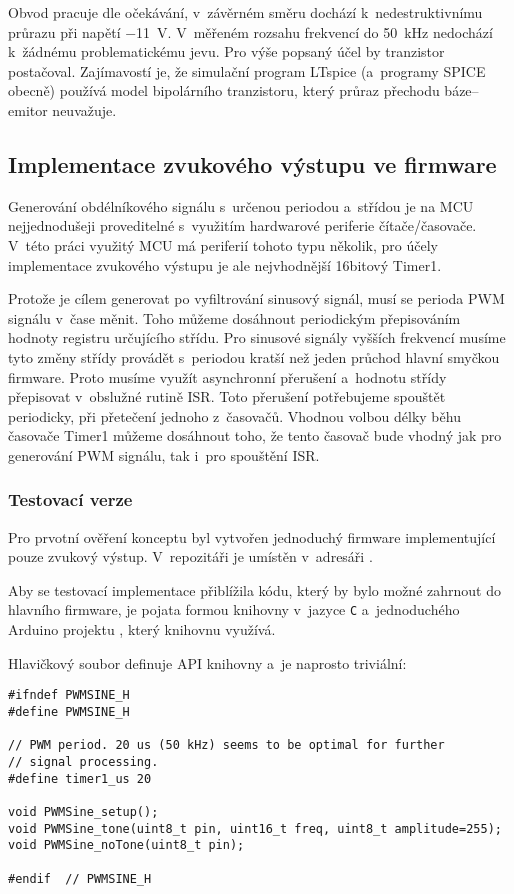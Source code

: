 Obvod pracuje dle očekávání, v~závěrném směru dochází k~nedestruktivnímu
průrazu při napětí \SI{-11}{\volt}. V~měřeném rozsahu frekvencí do
\SI{50}{\kilo\hertz} nedochází k~žádnému problematickému jevu. Pro výše popsaný
účel by tranzistor postačoval. Zajímavostí je, že simulační program LTspice
(a~programy SPICE obecně) používá model bipolárního tranzistoru, který průraz
přechodu báze--emitor neuvažuje.



\FloatBarrier  %
\subsection{Implementace zvukového výstupu ve firmware}
Generování obdélníkového signálu s~určenou periodou a~střídou je na MCU
nejjednodušeji proveditelné s~využitím hardwarové periferie čítače/časovače.
V~této práci využitý MCU má periferií tohoto typu několik, pro účely
implementace zvukového výstupu je ale nejvhodnější 16bitový Timer1.

Protože je cílem generovat po vyfiltrování sinusový signál, musí se perioda PWM
signálu v~čase měnit. Toho můžeme dosáhnout periodickým přepisováním hodnoty
registru určujícího střídu. Pro sinusové signály vyšších frekvencí musíme tyto
změny střídy provádět s~periodou kratší než jeden průchod hlavní smyčkou
firmware. Proto musíme využít asynchronní přerušení a~hodnotu střídy přepisovat
v~obslužné rutině ISR. Toto přerušení potřebujeme spouštět periodicky, při
přetečení jednoho z~časovačů. Vhodnou volbou délky běhu časovače Timer1 můžeme
dosáhnout toho, že tento časovač bude vhodný jak pro generování PWM signálu,
tak i~pro spouštění ISR.

\subsubsection{Testovací verze}
Pro prvotní ověření konceptu byl vytvořen jednoduchý firmware implementující
pouze zvukový výstup. V~repozitáři  je umístěn v~adresáři
.  %

Aby se testovací implementace přiblížila kódu, který by bylo možné zahrnout do
hlavního firmware, je pojata formou knihovny v~jazyce \texttt{C} a~jednoduchého
Arduino projektu , který knihovnu využívá.

Hlavičkový soubor  definuje API knihovny a~je naprosto
triviální:
\begin{lstlisting}[language=myC++,style=numbers]
#ifndef PWMSINE_H
#define PWMSINE_H

// PWM period. 20 us (50 kHz) seems to be optimal for further
// signal processing.
#define timer1_us 20

void PWMSine_setup();
void PWMSine_tone(uint8_t pin, uint16_t freq, uint8_t amplitude=255);
void PWMSine_noTone(uint8_t pin);

#endif  // PWMSINE_H
\end{lstlisting}

